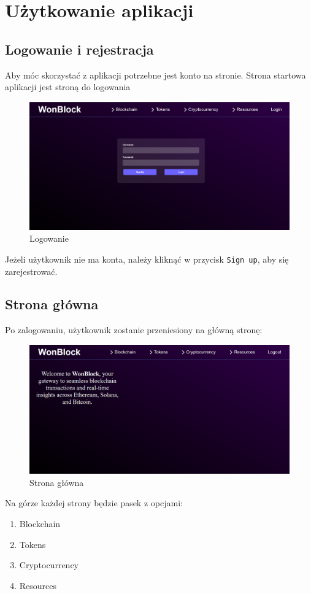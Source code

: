 \section{Użytkowanie aplikacji}
\subsection{Logowanie i rejestracja}
Aby móc skorzystać z aplikacji potrzebne jest konto na stronie. Strona startowa aplikacji jest stroną do logowania
\begin{figure}[htb]
    \centering
    \includegraphics[width=0.8\linewidth]{./instrukcja/Login.png}
    \caption{Logowanie}
    \label{fig:Logowanie}
\end{figure}
Jeżeli użytkownik nie ma konta, należy kliknąć w przycisk \texttt{Sign up}, aby się zarejestrować.

\subsection{Strona główna}
Po zalogowaniu, użytkownik zostanie przeniesiony na główną stronę:
\begin{figure}[htb]
    \centering
    \includegraphics[width=0.8\linewidth]{./instrukcja/mainpage.png}
    \caption{Strona główna}
    \label{fig:Strona główna}
\end{figure}

Na górze każdej strony będzie pasek z opcjami:
\begin{enumerate}
    \item Blockchain
    \item Tokens
    \item Cryptocurrency
    \item Resources
\end{enumerate}
